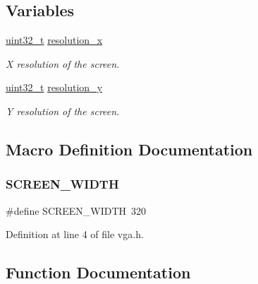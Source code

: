 \subsection*{Variables}
\begin{DoxyCompactItemize}
\item 
\hyperlink{a00134_a435d1572bf3f880d55459d9805097f62_a435d1572bf3f880d55459d9805097f62}{uint32\+\_\+t} \hyperlink{a00059_a9ee6ba1d990113ae2ca6c2373598da0a_a9ee6ba1d990113ae2ca6c2373598da0a}{resolution\+\_\+x}
\begin{DoxyCompactList}\small\item\em X resolution of the screen. \end{DoxyCompactList}\item 
\hyperlink{a00134_a435d1572bf3f880d55459d9805097f62_a435d1572bf3f880d55459d9805097f62}{uint32\+\_\+t} \hyperlink{a00059_ae49a6d814879c8efb7206d3d96412c4f_ae49a6d814879c8efb7206d3d96412c4f}{resolution\+\_\+y}
\begin{DoxyCompactList}\small\item\em Y resolution of the screen. \end{DoxyCompactList}\end{DoxyCompactItemize}


\subsection{Macro Definition Documentation}
\mbox{\label{a00059_a2cd109632a6dcccaa80b43561b1ab700_a2cd109632a6dcccaa80b43561b1ab700}} 
\subsubsection{\texorpdfstring{S\+C\+R\+E\+E\+N\+\_\+\+W\+I\+D\+TH}{SCREEN\_WIDTH}}
{\footnotesize\ttfamily \#define S\+C\+R\+E\+E\+N\+\_\+\+W\+I\+D\+TH~320}



Definition at line 4 of file vga.\+h.



\subsection{Function Documentation}
\mbox{\label{a00059_a2c8df7a20b47341b70d97a7ff21d86ea_a2c8df7a20b47341b70d97a7ff21d86ea}} 
